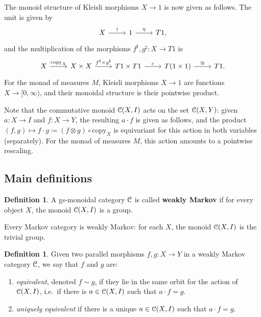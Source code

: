 \documentclass[a4paper,UKenglish,numberwithinsect,cleveref, autoref, thm-restate]{lipics-v2021}
\theoremstyle{plain} %
\theoremstyle{definition} %
\newtheorem{mydefinition}[mytheorem]{Definition}
\begin{document}
 The monoid structure of Kleisli morphisms $X\to 1$ is now given as follows. The unit is given by
 \[
 \begin{tikzcd}
  X \ar{r}{!} & 1 \ar{r}{\eta} & T1 ,
 \end{tikzcd}
 \]
 and the multiplication of the morphisms $f^\sharp,g^\sharp:X\to T1$ is
 \[
 \begin{tikzcd}
  X \ar{r}{\mathrm{copy}_X} & X\times X \ar{r}{f^\sharp\times g^\sharp} &
  T1 \times T1 \ar{r}{c} & T(1\times 1) \ar{r}{\cong} & T1 .
 \end{tikzcd}
 \]
 For the monad of measures $M$, Kleisli morphisms $X\to 1$ are functions $X\to [0,\infty)$, and their monoidal structure is their pointwise product. 

Note that the commutative monoid $\mathcal{C}(X,I)$ acts on the set $\mathcal{C}(X,Y)$: given $a:X\to I$ and $f:X\to Y$, the resulting $a\cdot f$ is given as follows,
and the product $(f,g)\mapsto f\cdot g \coloneqq (f\otimes g)\circ\mathrm{copy}_X$ is equivariant for this action in both variables (separately). 
For the monad of measures $M$, this action amounts to a pointwise rescaling.

\subsection{Main definitions}


\begin{mydefinition}
 A gs-monoidal category $\mathcal{C}$ is called \textbf{weakly Markov} if for every object $X$, the monoid $\mathcal{C}(X,I)$ is a group. 
\end{mydefinition}

Every Markov category is weakly Markov: for each $X$, the monoid $\mathcal{C}(X,I)$ is the trivial group.


\begin{mydefinition}
 Given two parallel morphisms $f,g:X\to Y$ in a weakly Markov category $\mathcal{C}$, we say that $f$ and $g$ are:
 \begin{enumerate}
  \item \emph{equivalent}, denoted $f\sim g$, if they lie in the same orbit for the action of $\mathcal{C}(X,I)$, i.e.~if there is $a\in \mathcal{C}(X,I)$ such that $a\cdot f=g$.
  \item \emph{uniquely equivalent} if there is a unique $a\in \mathcal{C}(X,I)$ such that $a\cdot f=g$.
 \end{enumerate}
\end{mydefinition}
\end{document}

